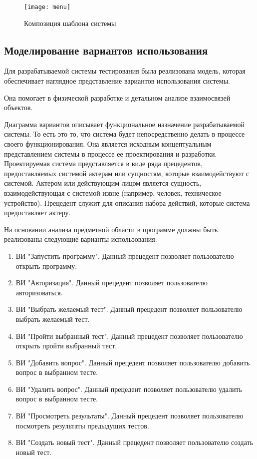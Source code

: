 \begin{figure}[ht]
\texttt{[image: menu]}
\caption{Композиция шаблона системы}
\label{menu:image}
\end{figure}

\subsection{Моделирование вариантов использования}

Для разрабатываемой системы тестирования была реализована модель, которая обеспечивает наглядное представление вариантов использования системы.

Она помогает в физической разработке и детальном анализе взаимосвязей объектов.

Диаграмма вариантов описывает функциональное назначение разрабатываемой системы. То есть это то, что система будет непосредственно делать в процессе своего функционирования. Она является исходным концептуальным представлением системы в процессе ее проектирования и разработки. Проектируемая система представляется в виде ряда прецедентов, предоставляемых системой актерам или сущностям, которые взаимодействуют с системой. Актером или действующим лицом является сущность, взаимодействующая с системой извне (например, человек, техническое устройство). Прецедент служит для описания набора действий, которые система предоставляет актеру.

На основании анализа предметной области в программе должны быть реализованы следующие варианты использования:
\begin{enumerate}
\item ВИ "Запустить программу". Данный прецедент позволяет пользователю открыть программу.
\item ВИ "Авторизация". Данный прецедент позволяет пользователю авторизоваться.
\item ВИ "Выбрать желаемый тест". Данный прецедент позволяет пользователю выбрать желаемый тест.
\item ВИ "Пройти выбранный тест". Данный прецедент позволяет пользователю открыть пройти выбранный тест.
\item ВИ "Добавить вопрос". Данный прецедент позволяет пользователю добавить вопрос в выбранном тесте.
\item ВИ "Удалить вопрос". Данный прецедент позволяет пользователю удалить вопрос в выбранном тесте.
\item ВИ "Просмотреть результаты". Данный прецедент позволяет пользователю посмотреть результаты предыдущих тестов.
\item ВИ "Создать новый тест". Данный прецедент позволяет пользователю создать новый тест.
\end{enumerate}

